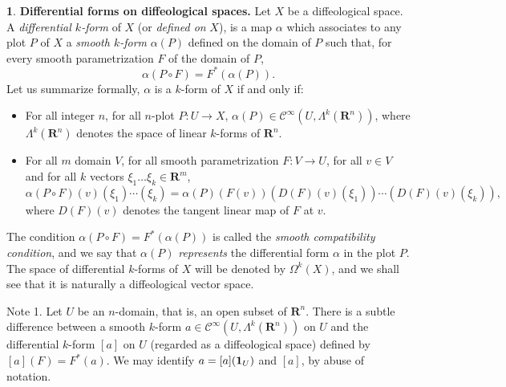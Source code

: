 \documentclass[11pt,reqno]{amsart}
\theoremstyle{definition}
\newtheorem{article}{}
\newcommand{\artlabel}[1]{{\bf #1.}}
\newcommand{\RR}{{\mathbf R}}
\def \D{{D}}
\def \F{{F}}
\def \P{{P}}
\def \U{{U}}
\def \V{{V}}
\def \X{{X}}
\newcommand{\cC}{{\mathcal C}}
\newcommand{\Form}{\mbox{$\Lambda$}}
\newcommand{\Cinf}{{\cC}^\infty}
\newcommand{\id}{{\bf 1}}
\begin{document}
  \begin{article}\artlabel{Differential forms on diffeological spaces}
    \label{Differential-forms-on-diffeological-spaces} 
    Let $\X$ be a diffeological space. A {\em differential
    $k$-form} of $\X$ (or {\em defined on} $\X$), is a map
    $\alpha$ which associates
    to any plot $\P$ of $\X$ a {\em smooth $k$-form} $\alpha(\P)$
    defined on the domain of $\P$ such that, for every
    smooth parametrization $\F$ of the domain of $\P$,
    $$
      \alpha(\P \circ \F) = \F^*(\alpha(\P)).
      $$
    Let us summarize formally, $\alpha$ is a
    $k$-form of $\X$ if and only if:
    
    \begin{itemize}
      \item[1)] For all integer $n$, for all $n$-plot $\P : \U \to
        \X$, $\alpha(\P) \in \Cinf(\U,\Form^k(\RR^n))$, where $\Form^k(\RR^n)$ denotes the 
      space of linear $k$-forms of $\RR^n$.
      \item[2)] For all $m$ domain $\V$, for all smooth
      parametrization $\F : \V \to \U$, for all $v \in \V$
      and for all $k$ vectors $\xi_1\ldots \xi_k \in
        \RR^m$, 
      $$
        \alpha(\P \circ \F)(v)(\xi_1)\cdots(\xi_k) =
        \alpha(\P)(\F(v))(\D(\F)(v)
        (\xi_1))\cdots(\D(\F)(v)(\xi_k)),
        $$ 
      where $\D(\F)(v)$ denotes the tangent linear map of $\F$ at $v$.
    \end{itemize}
    
    The condition $\alpha(\P \circ \F) = \F^*(\alpha(\P))$
    is called the {\em smooth compatibility condition},
    and we say that $\alpha(\P)$ {\em represents} the
    differential form $\alpha$ in the plot $\P$. 
    The space of differential $k$-forms of $\X$ will be denoted by
    $\Omega^k(\X)$, and we shall see that it is naturally a diffeological vector space.
    
    {\sc Note 1.} Let $\U$ be an $n$-domain, that is, an open subset of $\RR^n$. There is a subtle
    difference between a smooth $k$-form $a \in \Cinf(\U,\Lambda^k(\RR^n))$ on $\U$
    and the differential $k$-form $[a]$ on $\U$ (regarded as a diffeological space) 
    defined by $[a](\F) = \F^*(a)$. We may identify $a = [a](\id_\U)$ 
    and $[a]$, by abuse of notation.
    

\end{article}
\end{document}
